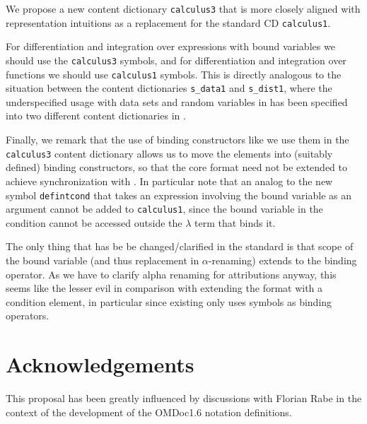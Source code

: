 \documentclass{llncs}
\begin{document}
We propose a new content dictionary {\texttt{calculus3}} that is more closely aligned with
{} representation intuitions as a replacement for the {\openmath} standard CD
{\texttt{calculus1}}.

For differentiation and integration over expressions with bound variables we should use
the {\texttt{calculus3}} symbols, and for differentiation and integration over functions
we should use {\texttt{calculus1}} symbols. This is directly analogous to the situation
between the content dictionaries {\texttt{s\_data1}} and {\texttt{s\_dist1}}, where the
underspecified usage with data sets and random variables in {\mathml} has been specified
into two different content dictionaries in {\openmath}.

Finally, we remark that the use of binding constructors like we use them in the
{\texttt{calculus3}} content dictionary allows us to move the {\mathml}
{} elements into (suitably defined) binding constructors, so that the
core {\openmath} format need not be extended to achieve synchronization with {\mathml}. In
particular note that an analog to the new symbol {\texttt{defintcond}} that takes an
expression involving the bound variable as an argument cannot be added to
{\texttt{calculus1}}, since the bound variable in the condition cannot be accessed outside
the $\lambda$ term that binds it.

The only thing that has be be changed/clarified in the {} standard is that scope
of the bound variable (and thus replacement in $\alpha$-renaming) extends to the binding
operator. As we have to clarify alpha renaming for attributions anyway, this seems like
the lesser evil in comparison with extending the {\openmath} format with a condition
element, in particular since existing {\openmath} only uses symbols as binding operators.

% 


\section{Acknowledgements}
This proposal has been greatly influenced by discussions with Florian Rabe in the context
of the development of the OMDoc1.6 notation definitions.

 

\end{document}
